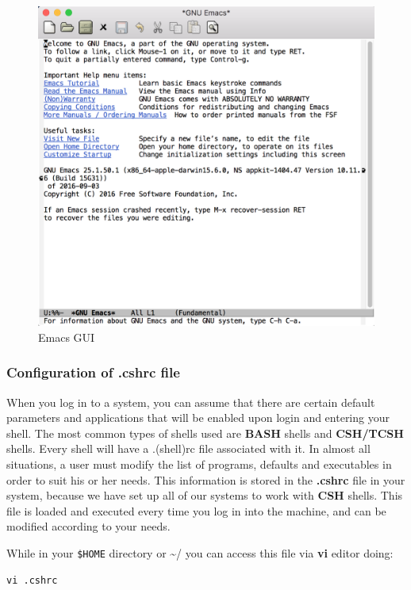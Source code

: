 \documentclass[11pt]{article}
\begin{document}
\begin{enumerate}
\begin{figure}[htbp]
\centering
\includegraphics[width=.9\linewidth]{./figures/emacs.png}
\caption{Emacs GUI}
\end{figure}
\end{enumerate}

\subsubsection{Configuration of .cshrc file}
\label{sec:org2733d03}
When you log in to a system, you can assume that there are certain default parameters and applications that will be enabled upon login and entering your shell. The most common types of shells used are \textbf{BASH} shells and \textbf{CSH/TCSH} shells. Every shell will have a .(shell)rc file associated with it. In almost all situations, a user must modify the list of programs, defaults and executables in order to suit his or her needs. This information is stored in the \textbf{.cshrc} file in your system, because we have set up all of our systems to work with \textbf{CSH} shells. 
This file is loaded and executed every time you log in into the machine, and can be modified according to your needs.

While in your \texttt{\$HOME} directory or \textasciitilde{}/ you can access this file via \textbf{vi} editor doing:
\begin{verbatim}
vi .cshrc
\end{verbatim}
\end{document}
